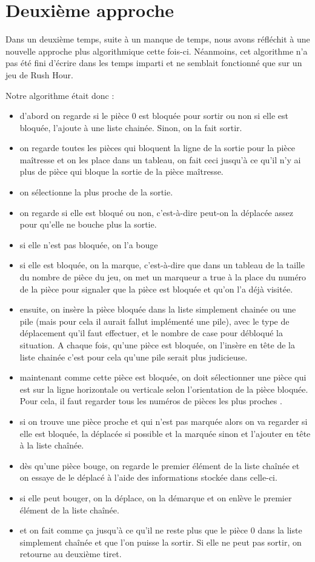 \documentclass{report}
\begin{document}
\section{Deuxième approche}
Dans un deuxième temps, suite à un manque de temps, nous avons réfléchit à une nouvelle approche plus algorithmique cette fois-ci. Néanmoins, cet algorithme n'a pas été fini d'écrire dans les temps imparti et ne semblait fonctionné que sur un jeu de Rush Hour.

Notre algorithme était donc :
\begin{itemize}
\item d'abord on regarde si le pièce 0 est bloquée pour sortir ou  non si elle est bloquée, l'ajoute à une liste chainée. Sinon, on la fait sortir.
\item on regarde toutes les pièces qui bloquent la ligne de la sortie pour la pièce maîtresse et on les place dans un tableau, on fait ceci jusqu'à ce qu'il n'y ai plus de pièce qui bloque la sortie de la pièce maîtresse.
\item on sélectionne la plus proche de la sortie.
\item on regarde si elle est bloqué ou non, c'est-à-dire peut-on la déplacée assez pour qu'elle ne bouche plus la sortie.
\item si elle n'est pas bloquée, on l'a bouge
\item si elle est bloquée, on la marque, c'est-à-dire que dans un tableau de la taille du nombre de pièce du jeu, on met un marqueur a true à la place du numéro de la  pièce pour signaler que la pièce est bloquée et qu'on l'a déjà visitée.
\item ensuite, on insère la pièce bloquée dans la liste simplement chainée ou une pile (mais pour cela il aurait fallut implémenté une pile), avec le type de déplacement qu'il faut effectuer, et le nombre de case pour débloqué la situation. A chaque fois, qu'une pièce est bloquée, on l'insère en tête de la liste chainée c'est pour cela qu'une pile serait plus judicieuse.
\item maintenant comme cette pièce est bloquée, on doit sélectionner une pièce qui est sur la ligne horizontale ou verticale selon l'orientation de la pièce bloquée. Pour cela, il faut regarder tous les numéros de pièces les plus proches .
\item si on trouve une pièce proche et qui n'est pas marquée alors on va regarder si elle est bloquée, la déplacée si possible et la marquée sinon et l'ajouter en tête à la liste chaînée.
\item dès qu'une pièce bouge, on regarde le premier élément de la liste chaînée et on essaye de le déplacé à l'aide des informations stockée dans celle-ci.
\item si elle peut bouger, on la déplace, on la démarque et on enlève le premier élément de la liste chaînée.
\item et on fait comme ça jusqu'à ce qu'il ne reste plus que le pièce 0 dans la liste simplement chaînée et que l'on puisse la sortir. Si elle ne peut pas sortir, on retourne au deuxième tiret. 
\end{itemize}
\end{document}

